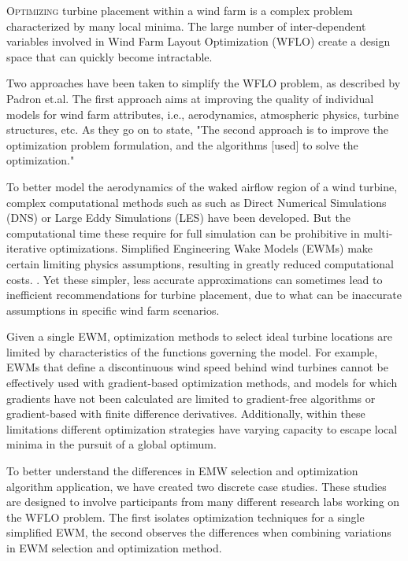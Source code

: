 \lettrine[nindent=0pt]{O}{ptimizing} turbine placement within a wind farm is a complex problem characterized by many local minima.
The large number of inter-dependent variables involved in Wind Farm Layout Optimization (WFLO) create a design space that can quickly become intractable.

Two approaches have been taken to simplify the WFLO problem, as described by Padron et.al.\cite{Padron2018} The first approach aims at improving the quality of individual models for wind farm attributes, i.e., aerodynamics, atmospheric physics, turbine structures, etc.
As they go on to state, "The second approach is to improve the optimization problem formulation, and the algorithms [used] to solve the optimization." \cite{Padron2018}

To better model the aerodynamics of the waked airflow region of a wind turbine, complex computational methods such as such as Direct Numerical Simulations (DNS) or Large Eddy Simulations (LES) have been developed.
But the computational time these require for full simulation can be prohibitive in multi-iterative optimizations.
Simplified Engineering Wake Models (EWMs) make certain limiting physics assumptions, resulting in greatly reduced computational costs. \cite{HerbertAcero2014}.
Yet these simpler, less accurate approximations can sometimes lead to inefficient recommendations for turbine placement, due to what can be inaccurate assumptions in specific wind farm scenarios. %

Given a single EWM, optimization methods to select ideal turbine locations are limited by characteristics of the functions governing the model.
For example, EWMs that define a discontinuous wind speed behind wind turbines cannot be effectively used with gradient-based optimization methods, and models for which gradients have not been calculated are limited to gradient-free algorithms or gradient-based with finite difference derivatives.
Additionally, within these limitations different optimization strategies have varying capacity to escape local minima in the pursuit of a global optimum. %

To better understand the differences in EMW selection and optimization algorithm application, we have created two discrete case studies.
These studies are designed to involve participants from many different research labs working on the WFLO problem.
The first isolates optimization techniques for a single simplified EWM, the second observes the differences when combining variations in EWM selection and optimization method.

